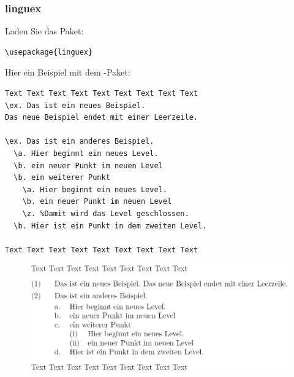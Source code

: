 \begin{frame}[fragile]
\frametitle{linguex}

Laden Sie das Paket:

\begin{lstlisting}
\usepackage{linguex}
\end{lstlisting}

\end{frame}


\begin{frame}[fragile]

Hier ein Beispiel mit dem -Paket:
{\small  
\begin{lstlisting}
Text Text Text Text Text Text Text Text Text 
\ex. Das ist ein neues Beispiel. 
Das neue Beispiel endet mit einer Leerzeile.

\ex. Das ist ein anderes Beispiel.
  \a. Hier beginnt ein neues Level.
  \b. ein neuer Punkt im neuen Level
  \b. ein weiterer Punkt
    \a. Hier beginnt ein neues Level.
    \b. ein neuer Punkt im neuen Level
    \z. %Damit wird das Level geschlossen.
  \b. Hier ist ein Punkt in dem zweiten Level.

Text Text Text Text Text Text Text Text Text 
\end{lstlisting}
}
\end{frame}

\begin{frame}[fragile]

\begin{figure}
	\centering
	\includegraphics[scale=.4]{../../texfiles-beamer/tex-material/WissArb-latex/linguex1}
\end{figure}

%
%
\end{frame}


